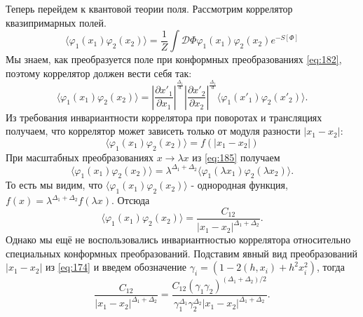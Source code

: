 \documentclass[a4paper,12pt]{article}
\theoremstyle{definition}
\theoremstyle{definition}
\theoremstyle{definition}
\begin{document}
Теперь перейдем к квантовой теории поля. Рассмотрим коррелятор квазипримарных полей.
\begin{equation}
  \label{eq:184}
  \langle \varphi_{1}(x_{1}) \varphi_{2}(x_{2})\rangle = \frac{1}{Z} \int \mathcal{D} \Phi \varphi_{1}(x_{1})\varphi_{2}(x_{2}) e^{-S[\Phi]}
\end{equation}
Мы знаем, как преобразуется поле при конформных преобразованиях \eqref{eq:182}, поэтому коррелятор должен вести себя так:
\begin{equation}
  \label{eq:185}
  \langle \varphi_{1}(x_{1})\varphi_{2}(x_{2})\rangle = \left|\frac{\partial x'_{1}}{\partial x_{1}}\right|^{\frac{\Delta_{1}}{d}}\left| \frac{\partial x'_{2}}{\partial x_{2}}\right|^{\frac{\Delta_{1}}{d}} \langle \varphi_{1}(x'_{1})\varphi_{2}(x'_{2})\rangle .
\end{equation}
Из требования инвариантности коррелятора при поворотах и трансляциях получаем, что коррелятор может зависеть только от модуля разности $\left|x_{1}-x_{2}\right|$:
\begin{equation}
  \label{eq:186}
  \langle \varphi_{1}(x_{1}) \varphi_{2}(x_{2})\rangle = f(\left|x_{1}-x_{2}\right|)
\end{equation}
При масштабных преобразованиях $x\to \lambda x$ из \eqref{eq:185} получаем
\begin{equation}
  \label{eq:187}
   \langle \varphi_{1}(x_{1}) \varphi_{2}(x_{2})\rangle=\lambda^{\Delta_{1}+\Delta_{2}}  \langle \varphi_{1}(\lambda x_{1}) \varphi_{2}(\lambda x_{2})\rangle .
\end{equation}
То есть мы видим, что $ \langle \varphi_{1}(x_{1}) \varphi_{2}(x_{2})\rangle$ - однородная функция, $f(x)=\lambda^{\Delta_{1}+\Delta_{2}} f(\lambda x)$. Отсюда
\begin{equation}
  \label{eq:188}
   \langle \varphi_{1}(x_{1}) \varphi_{2}(x_{2})\rangle = \frac{C_{12}}{\left|x_{1}-x_{2}\right|^{\Delta_{1}+\Delta_{2}}}.
\end{equation}
Однако мы ещё не воспользовались инвариантностью коррелятора относительно специальных конформных преобразований. Подставим явный вид преобразований $\left|x_{1}-x_{2}\right|$ из \eqref{eq:174} и введем обозначение $\gamma_{i}=\left(1-2(h,x_{i})+h^{2}x_{i}^{2}\right)$, тогда
\begin{equation}
  \label{eq:189}
  \frac{C_{12}}{\left|x_{1}-x_{2}\right|^{\Delta_{1}+\Delta_{2}}}=\frac{C_{12}(\gamma_{1}\gamma_{2})^{(\Delta_{1}+\Delta_{2})/2}}{\gamma_{1}^{\Delta_{1}}\gamma_{2}^{\Delta_{2}} \left|x_{1}-x_{2}\right|^{\Delta_1+\Delta_2}}.
\end{equation}
\end{document}
